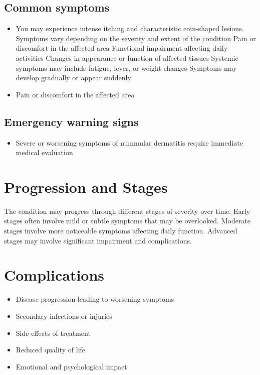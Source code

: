 \subsection{Common symptoms}
\begin{itemize}[noitemsep]
  \item You may experience intense itching and characteristic coin-shaped lesions. Symptoms vary depending on the severity and extent of the condition Pain or discomfort in the affected area Functional impairment affecting daily activities Changes in appearance or function of affected tissues Systemic symptoms may include fatigue, fever, or weight changes Symptoms may develop gradually or appear suddenly
  \item Pain or discomfort in the affected area
  \end{itemize}

\subsection{Emergency warning signs}
\begin{itemize}[noitemsep]
  \item Severe or worsening symptoms of nummular dermatitis require immediate medical evaluation
\end{itemize}
\section{Progression and Stages}
The condition may progress through different stages of severity over time. Early stages often involve mild or subtle symptoms that may be overlooked. Moderate stages involve more noticeable symptoms affecting daily function. Advanced stages may involve significant impairment and complications.
\section{Complications}
\begin{itemize}[noitemsep]
  \item Disease progression leading to worsening symptoms
  \item Secondary infections or injuries
  \item Side effects of treatment
  \item Reduced quality of life
  \item Emotional and psychological impact
\end{itemize}
